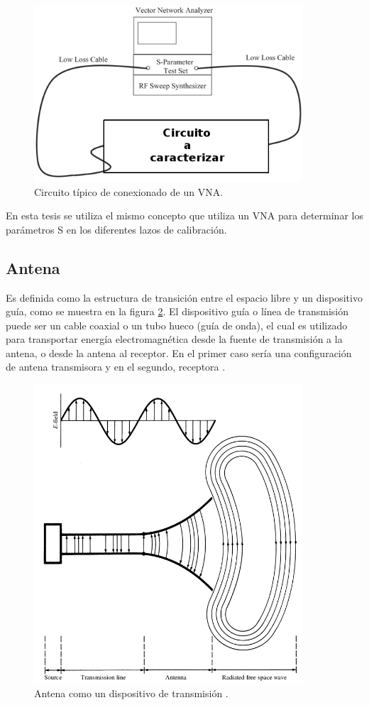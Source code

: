 \begin{figure}[H]
 \centering
 \includegraphics[width=10cm]{gfx/tipicalVNA.png}
 \caption{Circuito típico de conexionado de un VNA.}
 \label{fig:tipicalVNA}
\end{figure}

En esta tesis se utiliza el mismo concepto que utiliza un VNA para determinar los parámetros S en los diferentes lazos de 
calibración.


\subsection{Antena} 

Es definida como la estructura de transición entre el espacio libre y un dispositivo guía, como se muestra en la 
figura \ref{fig:antenna}. El dispositivo guía o línea de transmisión puede ser un cable coaxial o un tubo hueco (guía de 
onda), el cual es utilizado para transportar energía electromagnética desde la fuente de transmisión a la antena, o desde la 
antena al receptor. En el primer caso sería una configuración de antena transmisora y en el segundo, receptora \cite{Balanis2012}.
\begin{figure}[H]
 \centering
 \includegraphics[width=10cm]{gfx/antenna.png}
 \caption{Antena como un dispositivo de transmisión \cite{Balanis2012}.}
 \label{fig:antenna}
\end{figure}

